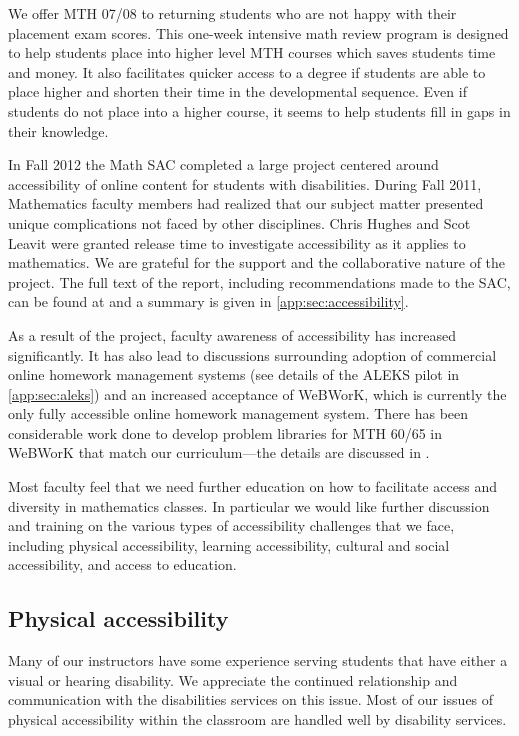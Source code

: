 We offer MTH 07/08  to returning students who are not happy with their
placement exam scores. This one-week intensive math review program is designed
to help students place into higher level MTH courses which saves students time
and money. It also facilitates quicker access to a degree if students are able
to place higher and shorten their time in the developmental sequence.  Even if
students do not place into a higher course, it seems to help students fill in
gaps in their knowledge.

In Fall 2012 the Math SAC completed a large project centered around accessibility of online content
for students with disabilities. During Fall 2011, Mathematics faculty members
had realized that our subject matter presented unique complications not faced by other
disciplines. Chris Hughes and Scot Leavit were granted release time to
investigate accessibility as it applies to mathematics. We are grateful for the
support and the collaborative nature of the project.\label{needs:page:disabilityservices}
The full text of the report, including recommendations made to the SAC, can be found at
\cite{accessibilityproject} and a summary is given in
\vref{app:sec:accessibility}.

As a result of the project, faculty awareness of accessibility has increased
significantly. It has also lead to discussions surrounding adoption of
commercial online homework management systems (see details of the ALEKS pilot
in \vref{app:sec:aleks}) and an increased acceptance of WeBWorK, which is currently
the only fully accessible online homework
management system. There has been considerable work done to develop problem
libraries for MTH 60/65 in WeBWorK that match our curriculum---the details are
discussed in .

Most faculty feel that we need further education on how to facilitate access
and diversity in mathematics classes. In particular we would like further
discussion and training on the various types of accessibility challenges that
we face, including physical accessibility, learning accessibility, cultural and
social accessibility, and access to education.

\subsection{Physical accessibility}
Many of our instructors have some experience serving students that have either
a visual or hearing disability. We appreciate the continued relationship and
communication with the disabilities services on this issue. Most of our issues
of physical accessibility within the classroom are handled well by disability
services.

